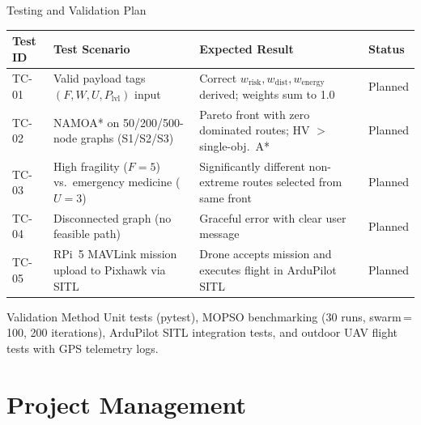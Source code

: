 \documentclass[aspectratio=169,11pt]{beamer}
\begin{document}
\begin{frame}{Testing and Validation Plan}
  \scriptsize
  \begin{tabularx}{\textwidth}{p{1.2cm} Y Y p{2.0cm}}
    \toprule
    \textbf{Test ID} & \textbf{Test Scenario} &
    \textbf{Expected Result} & \textbf{Status}\\
    \midrule
    TC-01 & Valid payload tags $(F,W,U,P_\mathrm{lvl})$ input &
      Correct $w_\mathrm{risk},w_\mathrm{dist},w_\mathrm{energy}$ derived;
      weights sum to 1.0 &
      Planned\\
    TC-02 & NAMOA* on 50/200/500-node graphs (S1/S2/S3) &
      Pareto front with zero dominated routes; HV $>$ single-obj.\ A* &
      Planned\\
    TC-03 & High fragility ($F{=}5$) vs.\ emergency medicine ($U{=}3$) &
      Significantly different non-extreme routes selected from same front &
      Planned\\
    TC-04 & Disconnected graph (no feasible path) &
      Graceful error with clear user message &
      Planned\\
    TC-05 & RPi~5 MAVLink mission upload to Pixhawk via SITL &
      Drone accepts mission and executes flight in ArduPilot SITL &
      Planned\\
    \bottomrule
  \end{tabularx}
  \vspace{0.25cm}
  \begin{block}{Validation Method}
    Unit tests (pytest), MOPSO benchmarking (30 runs, swarm\,=\,100,
    200 iterations), ArduPilot SITL integration tests, and outdoor UAV
    flight tests with GPS telemetry logs.
  \end{block}
\end{frame}

\section{Project Management}
\end{document}
